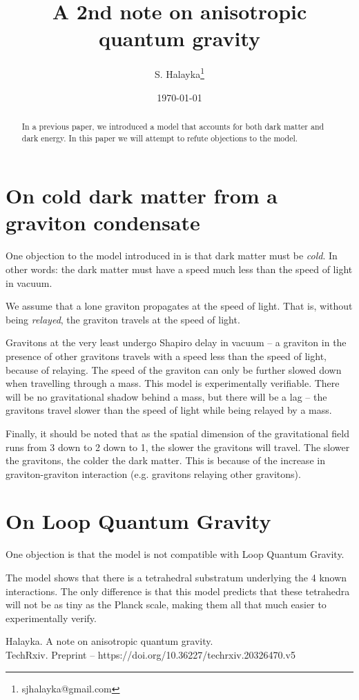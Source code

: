 \documentclass[12pt]{article}
\title{A 2nd note on anisotropic quantum gravity}
\author{S. Halayka\footnote{sjhalayka@gmail.com}}
\date{\today\;\currenttime}
\begin{document}
 
\maketitle

\begin{abstract}
In a previous paper, we introduced a model that accounts for both dark matter and dark energy. In this paper we will attempt to refute objections to the model.
\end{abstract}


\section{On cold dark matter from a graviton condensate}

One objection to the model introduced in \cite{halayka} is that dark matter must be {\textit{cold}}. 
In other words: the dark matter must have a speed much less than the speed of light in vacuum.

We assume that a lone graviton propagates at the speed of light. 
That is, without being {\textit{relayed}}, the graviton travels at the speed of light.

Gravitons at the very least undergo Shapiro delay in vacuum -- a graviton in the presence of other gravitons travels with a speed less than the speed of light, because of relaying.
The speed of the graviton can only be further slowed down when travelling through a mass.
This model is experimentally verifiable. 
There will be no gravitational shadow behind a mass, but there will be a lag -- the gravitons travel slower than the speed of light while being relayed by a mass.

Finally, it should be noted that as the spatial dimension of the gravitational field runs from 3 down to 2 down to 1, the slower the gravitons will travel.
The slower the gravitons, the colder the dark matter.
This is because of the increase in graviton-graviton interaction (e.g. gravitons relaying other gravitons).





\section{On Loop Quantum Gravity}

One objection is that the model is not compatible with Loop Quantum Gravity.

The model shows that there is a tetrahedral substratum underlying the 4 known interactions.
The only difference is that this model predicts that these tetrahedra will not be as tiny as the Planck scale, making them all that much easier to experimentally verify.







\begin{thebibliography}{9}

 Halayka. A note on anisotropic quantum gravity.\\TechRxiv. Preprint -- https://doi.org/10.36227/techrxiv.20326470.v5


\end{thebibliography}
\end{document}

